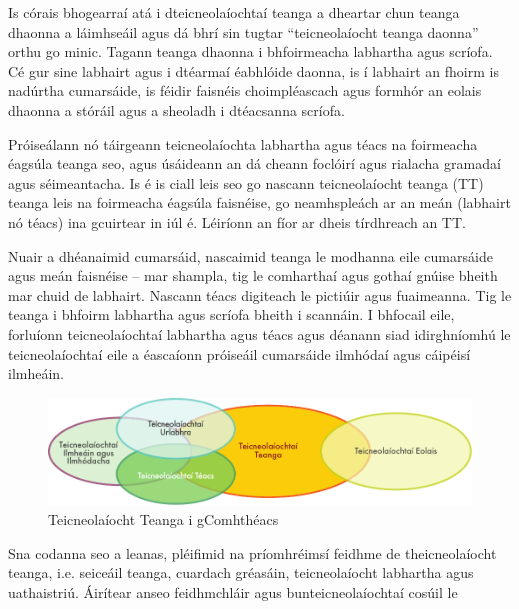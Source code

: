 \begin{multicols}{2}

Is córais bhogearraí atá i dteicneolaíochtaí teanga a dheartar chun teanga dhaonna a láimhseáil agus dá bhrí sin tugtar ``teicneolaíocht teanga daonna'' orthu go minic. Tagann teanga dhaonna i bhfoirmeacha labhartha agus scríofa. Cé gur sine labhairt agus i dtéarmaí éabhlóide daonna, is í labhairt an fhoirm is nadúrtha cumarsáide, is féidir faisnéis choimpléascach agus formhór an eolais dhaonna a stóráil agus a sheoladh i dtéacsanna scríofa. 

Próiseálann nó táirgeann teicneolaíochta labhartha agus téacs na foirmeacha éagsúla teanga seo,  agus úsáideann an dá cheann foclóirí agus rialacha gramadaí agus séimeantacha. Is é is ciall leis seo go nascann teicneolaíocht teanga (TT) teanga leis na foirmeacha éagsúla faisnéise, go neamhspleách ar an meán (labhairt nó téacs) ina gcuirtear in iúl é. Léiríonn an fíor ar dheis tírdhreach an TT.

Nuair a dhéanaimid cumarsáid, nascaimid teanga le modhanna eile cumarsáide agus meán faisnéise – mar shampla, tig le comharthaí agus gothaí gnúise bheith mar chuid de labhairt. Nascann téacs digiteach le pictiúir agus fuaimeanna. Tig le teanga i bhfoirm labhartha agus scríofa bheith i scannáin. I bhfocail eile, forluíonn teicneolaíochtaí labhartha agus téacs agus déanann siad idirghníomhú le teicneolaíochtaí eile a éascaíonn próiseáil cumarsáide ilmhódaí agus cáipéisí ilmheáin. 

\begin{figure}[htb]
  \center
  \includegraphics[width=\textwidth]{../_media/irish/language_technologies}
  \caption{Teicneolaíocht Teanga i gComhthéacs}
  \label{fig:ltincontext_de}
\end{figure}



Sna codanna seo a leanas, pléifimid na príomhréimsí feidhme de theicneolaíocht teanga, i.e. seiceáil teanga, cuardach gréasáin, teicneolaíocht labhartha agus uathaistriú. Áirítear anseo feidhmchláir agus bunteicneolaíochtaí cosúil le


\end{multicols}
